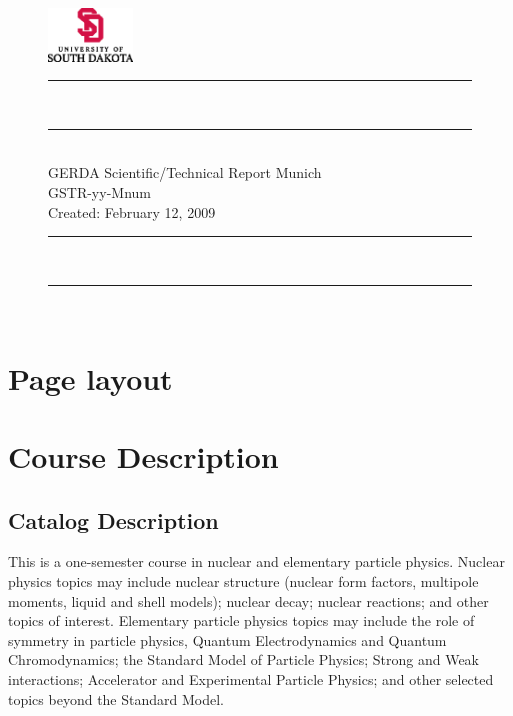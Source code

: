 \documentclass[11pt, letterpaper]{article}
\begin{document}
\begin{figure}[t!]\centering
  \includegraphics[width=0.2\textwidth]{usd.logo.eps}\hfil
  \begin{minipage}[b]{0.75\linewidth}\centering
    \rule[-4.2mm]{\textwidth}{0.3mm}\\\rule{0.98\textwidth}{0.1mm}\\
    GERDA Scientific/Technical Report Munich\\\vspace{2mm}
    GSTR-yy-Mnum \\\vspace{2mm}
    Created: February 12, 2009\\\vspace{-7.5mm}
    \rule[-5mm]{0.98\textwidth}{0.1mm}\\\rule{\textwidth}{0.3mm}\\
  \end{minipage}%
\end{figure}

\section{Page layout}
\label{sec:manual}

\layout

\section{Course Description}
\label{s:desc}

\subsection{Catalog Description}
\label{ss:cata}

This is a one-semester course in nuclear and elementary particle physics.  
Nuclear physics topics may include nuclear structure (nuclear form factors, 
multipole moments, liquid and shell models); nuclear decay; nuclear reactions; 
and other topics of interest.  Elementary particle physics topics may include 
the role of symmetry in particle physics, Quantum Electrodynamics and Quantum 
Chromodynamics; the Standard Model of Particle Physics; Strong and Weak 
interactions; Accelerator and Experimental Particle Physics; and other selected 
topics beyond the Standard Model.
\end{document}
